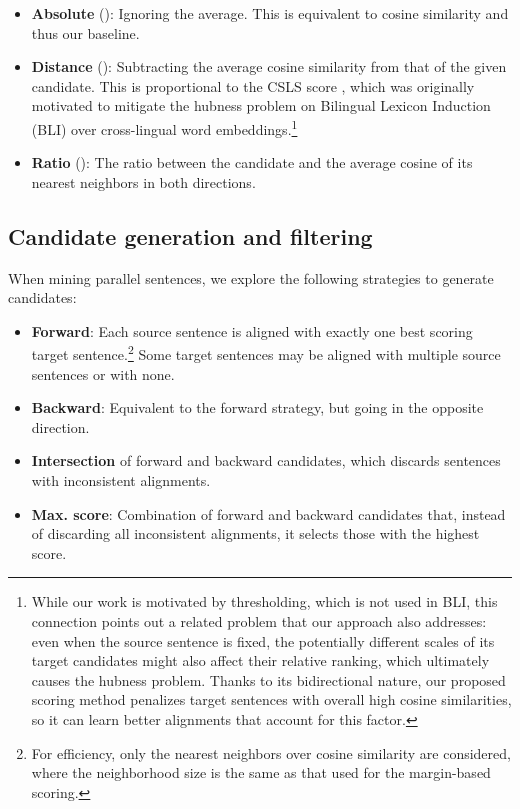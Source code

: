 \documentclass[11pt,a4paper]{article}
\begin{document}
\begin{itemize}
    \item \textbf{Absolute} (): Ignoring the average. This is equivalent to cosine similarity and thus our baseline.
    \item \textbf{Distance} (): Subtracting the average cosine similarity from that of the given candidate. This is proportional to the CSLS score \citep{conneau2018word}, which was originally motivated to mitigate the hubness problem on Bilingual Lexicon Induction (BLI) over cross-lingual word embeddings.\footnote{While our work is motivated by thresholding, which is not used in BLI, this connection points out a related problem that our approach also addresses: even when the source sentence is fixed, the potentially different scales of its target candidates might also affect their relative ranking, which ultimately causes the hubness problem. Thanks to its bidirectional nature, our proposed scoring method penalizes target sentences with overall high cosine similarities, so it can learn better alignments that account for this factor.}
    \item \textbf{Ratio} (): The ratio between the candidate and the average cosine of its nearest neighbors in both directions.
\end{itemize}




\subsection{Candidate generation and filtering} \label{subsec:filtering}

When mining parallel sentences, we explore the following strategies to generate candidates:
\begin{itemize}
    \item \textbf{Forward}: Each source sentence is aligned with exactly one best scoring target sentence.\footnote{For efficiency, only the  nearest neighbors over cosine similarity are considered, where the neighborhood size  is the same as that used for the margin-based scoring.} Some target sentences may be aligned with multiple source sentences or with none.
    \item \textbf{Backward}: Equivalent to the forward strategy, but going in the opposite direction.
    \item \textbf{Intersection} of forward and backward candidates, which discards sentences with inconsistent alignments.
    \item \textbf{Max. score}: Combination of forward and backward candidates that, instead of discarding all inconsistent alignments, it selects those with the highest score.
\end{itemize}
\end{document}
